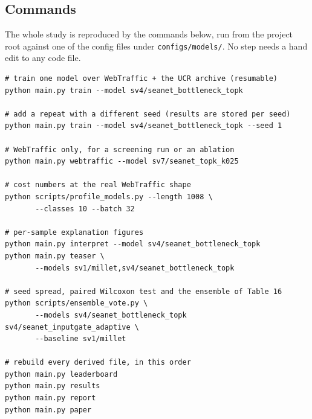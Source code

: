 
\subsection{Commands}
\label{app:commands}

The whole study is reproduced by the commands below, run from the project root against one of the
config files under \texttt{configs/models/}. No step needs a hand edit to any code file.

\begin{verbatim}
# train one model over WebTraffic + the UCR archive (resumable)
python main.py train --model sv4/seanet_bottleneck_topk

# add a repeat with a different seed (results are stored per seed)
python main.py train --model sv4/seanet_bottleneck_topk --seed 1

# WebTraffic only, for a screening run or an ablation
python main.py webtraffic --model sv7/seanet_topk_k025

# cost numbers at the real WebTraffic shape
python scripts/profile_models.py --length 1008 \
       --classes 10 --batch 32

# per-sample explanation figures
python main.py interpret --model sv4/seanet_bottleneck_topk
python main.py teaser \
       --models sv1/millet,sv4/seanet_bottleneck_topk

# seed spread, paired Wilcoxon test and the ensemble of Table 16
python scripts/ensemble_vote.py \
       --models sv4/seanet_bottleneck_topk sv4/seanet_inputgate_adaptive \
       --baseline sv1/millet

# rebuild every derived file, in this order
python main.py leaderboard
python main.py results
python main.py report
python main.py paper
\end{verbatim}

